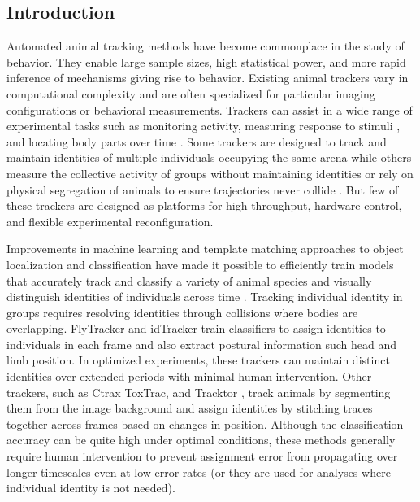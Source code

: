 \documentclass[10pt]{article}
\begin{document}
\vspace{1cm}
\begin{multicols}{2}
\noindent
\section*{Introduction}

Automated animal tracking methods have become commonplace in the study of behavior. They enable large sample sizes, high statistical power, and more rapid inference of mechanisms giving rise to behavior. Existing animal trackers vary in computational complexity and are often specialized for particular imaging configurations or behavioral measurements. Trackers can assist in a wide range of experimental tasks such as monitoring activity, measuring response to stimuli \citep{Fry_TrackFly_2008,Donelson_High_2012}, and locating body parts over time \citep{Mathis_DeepLabCut_2018,Pereira_Fast_2018}. Some trackers are designed to track and maintain identities of multiple individuals occupying the same arena \citep{Prez-Escudero_idTracker_2014,Eyjolfsdottir_Detecting_2014,Rodriguez_ToxId_2017,romero-ferrero_2019} while others measure the collective activity of groups without maintaining identities or rely on physical segregation of animals to ensure trajectories never collide \citep{Ramot_The_2008,Swierczek_High_2011,Itskovits_A_2017,Scaplen_Automated_2019}. But few of these trackers are designed as platforms for high throughput, hardware control, and flexible experimental reconfiguration. 

Improvements in machine learning and template matching approaches to object localization and classification have made it possible to efficiently train models that accurately track and classify a variety of animal species and visually distinguish identities of individuals across time \citep{Eyjolfsdottir_Detecting_2014,Prez-Escudero_idTracker_2014,schneider_2018}. Tracking individual identity in groups requires resolving identities through collisions where bodies are overlapping. FlyTracker and idTracker train classifiers to assign identities to individuals in each frame and also extract postural information such head and limb position. In optimized experiments, these trackers can maintain distinct identities over extended periods with minimal human intervention. Other trackers, such as Ctrax ToxTrac, and Tracktor \citep{Branson_High_2009,Rodriguez_ToxId_2017,Sridhar_2019}, track animals by segmenting them from the image background and assign identities by stitching traces together across frames based on changes in position. Although the classification accuracy can be quite high under optimal conditions, these methods generally require human intervention to prevent assignment error from propagating over longer timescales even at low error rates (or they are used for analyses where individual identity is not needed). 


\end{multicols}
\end{document}
